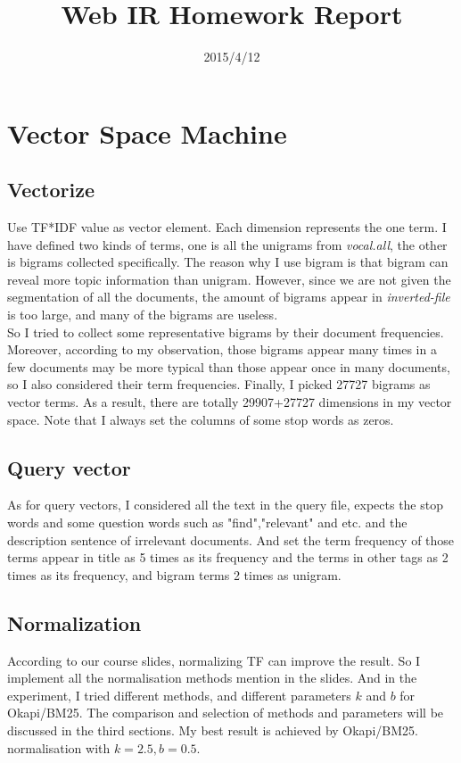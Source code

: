 \documentclass[11pt, oneside]{article}   	%
\title{Web IR Homework Report}
\date{2015/4/12}							%
\begin{document}
\maketitle

\section{Vector Space Machine}
\subsection{Vectorize}
Use TF*IDF value as vector element. Each dimension represents the one term. I have defined two kinds of terms, one is all the unigrams from \emph{vocal.all}, the other is bigrams collected specifically.  The reason why I use bigram is that  bigram can reveal more topic information than unigram.  However, since we are not given the segmentation of all the documents, the amount of bigrams appear in \emph{inverted-file} is too large, and many of the bigrams are useless.\\ 

So I tried to collect some representative bigrams by their document frequencies. Moreover, according to my observation, those bigrams appear many times in a few documents may be more typical than those appear once in many documents, so I also considered their term frequencies. Finally, I picked 27727 bigrams as vector terms. As a result, there are totally 29907+27727 dimensions in my vector space. Note that I always set the columns of some stop words as zeros.
\subsection{Query vector}
As for query vectors, I considered all the text in the query file, expects the stop words and some question words such as "find","relevant" and etc. and the description sentence of irrelevant documents.  And set the term frequency of those terms appear in title as 5 times as its frequency and the terms in other tags as 2 times as its frequency, and bigram terms  2 times as unigram.
\subsection{Normalization}
According to our course slides, normalizing TF can improve the result. So I implement all the normalisation methods mention in the slides. And in the experiment, I tried different methods, and different parameters $k$ and $b$ for Okapi/BM25. The comparison and selection of methods and parameters will be discussed in the third sections. My best result is achieved by Okapi/BM25. normalisation with $k=2.5, b=0.5$.
\end{document}
